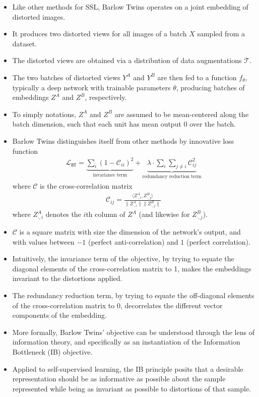 \documentclass[10pt]{article}
\newcommand{\CC}{\mathcal{C}}
\newcommand{\LL}{\mathcal{L}}
\newcommand{\TT}{\mathcal{T}}
\newcommand{\bt}{{\texttt{BT}}}
\begin{document}
\begin{itemize}
\item Like other methods for SSL, Barlow Twins operates on a joint embedding of distorted images.
\item It produces two distorted views for all images of a batch $X$ sampled from a dataset.
\item The distorted views are obtained via a distribution of data augmentations $\TT$.
\item The two batches of distorted views $Y^A$ and $Y^B$ are then fed to a function $f_\theta$, typically a deep network with trainable parameters $\theta$, producing batches of embeddings $Z^A$ and $Z^B$, respectively.
\item To simply notations, $Z^A$ and $Z^B$ are assumed to be mean-centered along the batch dimension, such that each unit has mean output 0 over the batch.
\item Barlow Twins distinguishes itself from other methods by innovative loss function
\begin{align*}
\LL_\bt = \underbrace{\sum_i (1 - \CC_{ii})^2}_{\text{invariance term}} + \underbrace{\lambda \cdot \sum_i \sum_{j \neq i} \CC_{ij}^2}_{\text{redundancy reduction term}}
\end{align*}
where $\CC$ is the cross-correlation matrix
\begin{align*}
\CC_{ij} = \frac{\langle Z^A_{\cdot,i}, Z^B_{\cdot,j} \rangle}{\| Z^A_{\cdot,i} \| \| Z^B_{\cdot,j} \|}
\end{align*}
where $Z^A_{\cdot,i}$ denotes the $i$th column of $Z^A$ (and likewise for $Z^B_{\cdot,j}$).
\item $\CC$ is a square matrix with size the dimension of the network's output, and with values between $-1$ (perfect anti-correlation) and $1$ (perfect correlation).
\item Intuitively, the invariance term of the objective, by trying to equate the diagonal elements of the cross-correlation matrix to 1, makes the embeddings invariant to the distortions applied.
\item The redundancy reduction term, by trying to equate the off-diagonal elements of the cross-correlation matrix to 0, decorrelates the different vector components of the embedding.
\item More formally, Barlow Twins' objective can be understood through the lens of information theory, and specifically as an instantiation of the Information Bottleneck (IB) objective.
\item Applied to self-supervised learning, the IB principle posits that a desirable representation should be as informative as possible about the sample represented while being as invariant as possible to distortions of that sample.

\end{itemize}
\end{document}
